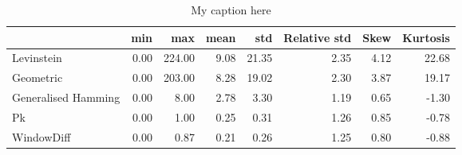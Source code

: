 \begin{table}[!ht]
\centering
\begin{tabular}{lrrrrrrr}
\toprule
{} &  min &    max &  mean &   std &  Relative std &  Skew &  Kurtosis \\
\midrule
Levinstein          & 0.00 & 224.00 &  9.08 & 21.35 &          2.35 &  4.12 &     22.68 \\
Geometric           & 0.00 & 203.00 &  8.28 & 19.02 &          2.30 &  3.87 &     19.17 \\
Generalised Hamming & 0.00 &   8.00 &  2.78 &  3.30 &          1.19 &  0.65 &     -1.30 \\
Pk                  & 0.00 &   1.00 &  0.25 &  0.31 &          1.26 &  0.85 &     -0.78 \\
WindowDiff          & 0.00 &   0.87 &  0.21 &  0.26 &          1.25 &  0.80 &     -0.88 \\
\bottomrule
\end{tabular}
\caption{My caption here}
\label{tab:distance-descriptions}
\end{table}